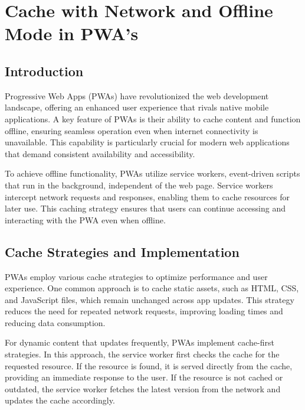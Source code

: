 \documentclass{report}
\begin{document}


\tableofcontents

\chapter{Cache with Network and Offline Mode in PWA's}\label{Cache with Network and Offline Mode in PWA's}
\section{Introduction}\label{intro}
Progressive Web Apps (PWAs) have revolutionized the web development landscape, offering an enhanced user experience that rivals native mobile applications. A key feature of PWAs is their ability to cache content and function offline, ensuring seamless operation even when internet connectivity is unavailable. This capability is particularly crucial for modern web applications that demand consistent availability and accessibility.

To achieve offline functionality, PWAs utilize service workers, event-driven scripts that run in the background, independent of the web page. Service workers intercept network requests and responses, enabling them to cache resources for later use. This caching strategy ensures that users can continue accessing and interacting with the PWA even when offline.

\section{Cache Strategies and Implementation}\label{Cache Strategies and Implementation}
PWAs employ various cache strategies to optimize performance and user experience. One common approach is to cache static assets, such as HTML, CSS, and JavaScript files, which remain unchanged across app updates. This strategy reduces the need for repeated network requests, improving loading times and reducing data consumption. \cite{mdn_js13kgames_offline_service_workers}

For dynamic content that updates frequently, PWAs implement cache-first strategies. In this approach, the service worker first checks the cache for the requested resource. If the resource is found, it is served directly from the cache, providing an immediate response to the user. If the resource is not cached or outdated, the service worker fetches the latest version from the network and updates the cache accordingly. \cite{kouassi2021_pwa_cache_offline}
\end{document}
